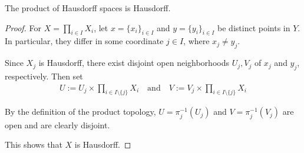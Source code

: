 \begin{lem}[]
The product of Hausdorff spaces is Hausdorff.
\end{lem}
\begin{proof}
For $X = \prod_{i \in I}X_i$, let $x = \{x_i\}_{i \in I}$ and $y = \{y_i\}_{i \in I}$ be distinct points in $Y$.
In particular, they differ in some coordinate $j \in I$, where $x_j \neq y_j$.

Since $X_j$ is Hausdorff, there exist disjoint open neighborhoods $U_j,V_j$ of $x_j$ and $y_j$, respectively.
Then set
\begin{align*}
  U := U_j \times \prod_{i \in I \setminus \{j\}} X_i \quad \text{and} \quad V := V_j \times \prod_{i \in I \setminus \{j\}} X_i
\end{align*}

By the definition of the product topology, $U = \pi_j^{-1}(U_j)$ and $V = \pi_j^{-1}(V_j)$ are open and are clearly disjoint.

This shows that $X$ is Hausdorff.
\end{proof}

